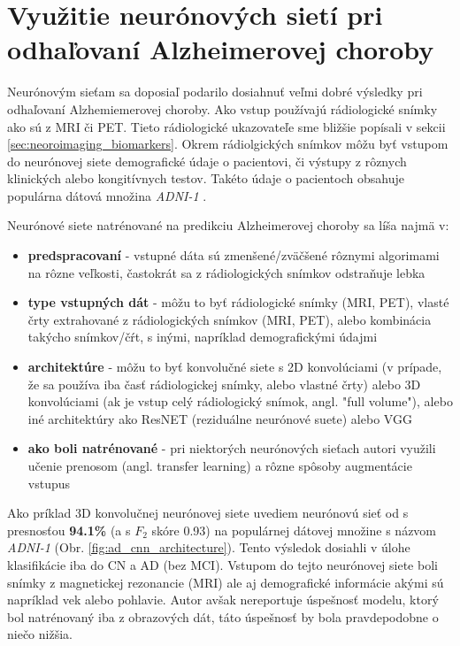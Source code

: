 \section{Využitie neurónových sietí pri odhaľovaní Alzheimerovej choroby \label{sec:nn_ad_prediction}}

Neurónovým sieťam sa doposiaľ podarilo dosiahnuť veľmi dobré výsledky pri odhaľovaní Alzhemiemerovej choroby. Ako vstup používajú rádiologické snímky ako sú z MRI či PET. Tieto rádiologické ukazovateľe sme bližšie popísali v sekcii \ref{sec:neoroimaging_biomarkers}. Okrem rádiolgických snímkov môžu byť vstupom do neurónovej siete demografické údaje o pacientovi, či výstupy z rôznych klinických alebo kongitívnych testov. Takéto údaje o pacientoch obsahuje populárna dátová množina \textit{ADNI-1} \cite{ADNI}.

Neurónové siete natrénované na predikciu Alzheimerovej choroby sa líša najmä v:
\begin{itemize}
    \item \textbf{predspracovaní} - vstupné dáta sú zmenšené/zväčšené rôznymi algorimami na rôzne veľkosti, častokrát sa z rádiologických snímkov odstraňuje lebka
    \item \textbf{type vstupných dát} - môžu to byť rádiologické snímky (MRI, PET), vlasté črty extrahované z rádiologických snímkov (MRI, PET), alebo kombinácia takýcho snímkov/čŕt, s inými, napríklad demografickými údajmi
    \item \textbf{architektúre} - môžu to byť konvolučné siete s 2D konvolúciami (v prípade, že sa používa iba časť rádiologickej snímky, alebo vlastné črty) alebo 3D konvolúciami (ak je vstup celý rádiologický snímok, angl. "full volume"), alebo iné architektúry ako ResNET (reziduálne neurónové suete) alebo VGG
    \item \textbf{ako boli natrénované} - pri niektorých neurónových sieťach autori využili učenie prenosom (angl. transfer learning) a rôzne spôsoby augmentácie vstupus
\end{itemize}

Ako príklad 3D konvolučnej neurónovej siete uvediem neurónovú sieť od \citeauthor*{esmaeilzadeh2018end} s presnosťou \textbf{94.1\%} (a s $F_2$ skóre 0.93) na populárnej dátovej množine s názvom \textit{ADNI-1} (Obr. \ref{fig:ad_cnn_architecture}). Tento výsledok dosiahli v úlohe klasifikácie iba do CN a AD (bez MCI). Vstupom do tejto neurónovej siete boli snímky z magnetickej rezonancie (MRI) ale aj demografické informácie akými sú napríklad vek alebo pohlavie. Autor avšak nereportuje úspešnosť modelu, ktorý bol natrénovaný iba z obrazových dát, táto úspešnosť by bola pravdepodobne o niečo nižšia.

